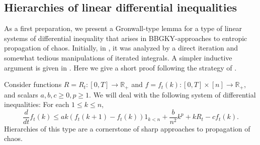 \documentclass[11pt,reqno]{amsart}
\numberwithin{equation}{section}
\theoremstyle{definition}
\def\R{{\mathbb R}}
\begin{document}
\subsection{Hierarchies of linear differential inequalities}

As a first preparation, we present a Gronwall-type lemma for a type of linear systems of differential inequality that arises in BBGKY-approaches to entropic propagation of chaos. Initially, in \cite{HierarchiesPaper}, it was analyzed by a direct iteration and somewhat tedious manipulations of iterated integrals. A simpler inductive argument is given in \cite{Hess-Childs2025-ux}. Here we give a short proof following the strategy of \cite[Section 1.4]{lacker2024quantitativepropagationchaosnonexchangeable}.

Consider functions $R=R_t:[0,T] \to \R_+$ and $f=f_t(k) : [0,T] \times [n] \to \R_+$, and scalars $a,b,c\geq 0, p\geq 1$. We will deal with the following system of differential inequalities: For each $1 \le k \le n$, 
\begin{equation}
\label{eq: linear differential inequality}
    \frac{d}{dt}f_t(k)\leq ak(f_t(k+1)-f_t(k))1_{k < n}  + \frac{b}{n^2}k^p + kR_t - cf_t(k).
\end{equation}
Hierarchies of this type are a cornerstone of sharp approaches to propagation of chaos. 
\end{document}
